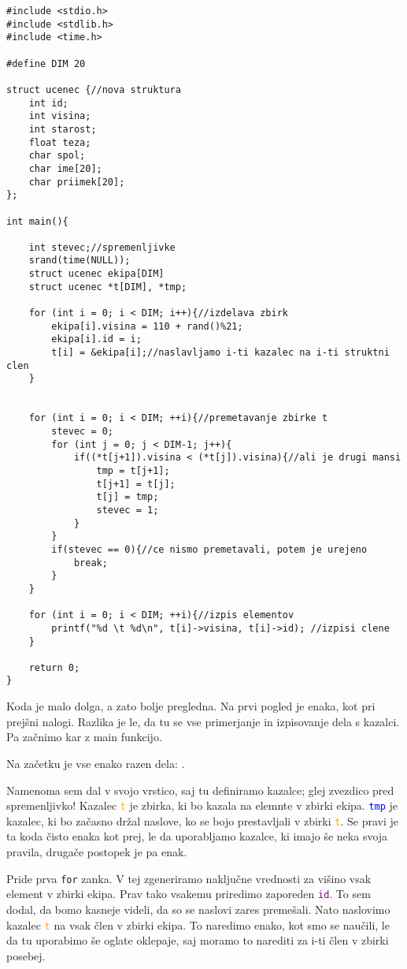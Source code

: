 \documentclass[a4paper, 12pt]{article}
\begin{document}
\begin{lstlisting}
#include <stdio.h>
#include <stdlib.h>
#include <time.h>

#define DIM 20

struct ucenec {//nova struktura
	int id;
	int visina;
	int starost;
	float teza;
	char spol;
	char ime[20];
	char priimek[20];
};

int main(){

	int stevec;//spremenljivke
	srand(time(NULL));
	struct ucenec ekipa[DIM]
	struct ucenec *t[DIM], *tmp;
	
	for (int i = 0; i < DIM; i++){//izdelava zbirk
		ekipa[i].visina = 110 + rand()%21;
		ekipa[i].id = i;
		t[i] = &ekipa[i];//naslavljamo i-ti kazalec na i-ti struktni clen
	}
	
	
	for (int i = 0; i < DIM; ++i){//premetavanje zbirke t
		stevec = 0;
		for (int j = 0; j < DIM-1; j++){
			if((*t[j+1]).visina < (*t[j]).visina){//ali je drugi mansi
				tmp = t[j+1];
				t[j+1] = t[j];
				t[j] = tmp;
				stevec = 1;
			}
		}
		if(stevec == 0){//ce nismo premetavali, potem je urejeno
			break;
		}
	}
	
	for (int i = 0; i < DIM; ++i){//izpis elementov
		printf("%d \t %d\n", t[i]->visina, t[i]->id); //izpisi clene
	}
	
	return 0;
}
\end{lstlisting}

Koda je malo dolga, a zato bolje pregledna. Na prvi pogled je enaka, kot pri prejšni nalogi. Razlika je le, da tu se vse primerjanje in izpisovanje dela s kazalci. Pa začnimo kar z main funkcijo.\

Na začetku je vse enako razen dela: .

Namenoma sem dal v svojo vrstico, saj tu definiramo kazalce; glej zvezdico pred spremenljivko! Kazalec \textcolor{orange}{\texttt{t}} je zbirka, ki bo kazala na elemnte v zbirki ekipa. \textcolor{blue}{\texttt{tmp}} je kazalec, ki bo začasno držal naslove, ko se bojo prestavljali v zbirki \textcolor{orange}{\texttt{t}}. Se pravi je ta koda čisto enaka kot prej, le da uporabljamo kazalce, ki imajo še neka svoja pravila, drugače postopek je pa enak.\

Pride prva \lstinline|for| zanka. V tej zgeneriramo naključne vrednosti za višino vsak element v zbirki ekipa. Prav tako vsakemu priredimo zaporeden \textcolor{purple}{\texttt{id}}. To sem dodal, da bomo kasneje videli, da so se naslovi zares premešali. Nato naslovimo kazalec \textcolor{orange}{\texttt{t}} na vsak člen v zbirki ekipa. To naredimo enako, kot smo se naučili, le da tu uporabimo še oglate oklepaje, saj moramo to narediti za i-ti člen v zbirki posebej.\
\end{document}
